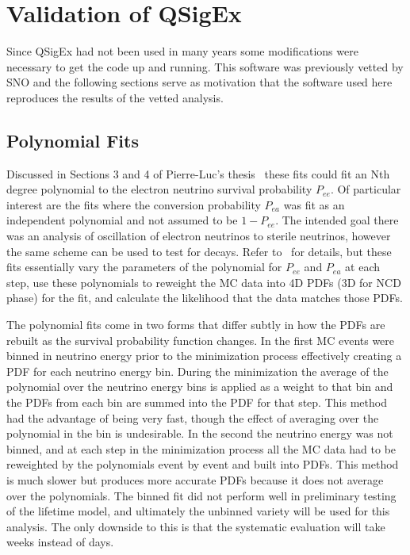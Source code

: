 \chapter{Validation of QSigEx}
\label{qsigex_validation}

Since QSigEx had not been used in many years some modifications were necessary to get the code up and running. 
This software was previously vetted by SNO and the following sections serve as motivation that the software used here reproduces the results of the vetted analysis.

\section{Polynomial Fits}

Discussed in Sections 3 and 4 of Pierre-Luc's thesis~\cite{plthesis} these fits could fit an Nth degree polynomial to the electron neutrino survival probability $P_{ee}$. 
Of particular interest are the fits where the conversion probability $P_{ea}$ was fit as an independent polynomial and not assumed to be $1-P_{ee}$. 
The intended goal there was an analysis of oscillation of electron neutrinos to sterile neutrinos, however the same scheme can be used to test for decays.
Refer to~\cite{plthesis} for details, but these fits essentially vary the parameters of the polynomial for $P_{ee}$ and $P_{ea}$ at each step, use these polynomials to reweight the MC data into 4D PDFs (3D for NCD phase) for the fit, and calculate the likelihood that the data matches those PDFs. 

The polynomial fits come in two forms that differ subtly in how the PDFs are rebuilt as the survival probability function changes.
In the first MC events were binned in neutrino energy prior to the minimization process effectively creating a PDF for each neutrino energy bin. 
During the minimization the average of the polynomial over the neutrino energy bins is applied as a weight to that bin and the PDFs from each bin are summed into the PDF for that step.
This method had the advantage of being very fast, though the effect of averaging over the polynomial in the bin is undesirable.
In the second the neutrino energy was not binned, and at each step in the minimization process all the MC data had to be reweighted by the polynomials event by event and built into PDFs. 
This method is much slower but produces more accurate PDFs because it does not average over the polynomials.
The binned fit did not perform well in preliminary testing of the lifetime model, and ultimately the unbinned variety will be used for this analysis.
The only downside to this is that the systematic evaluation will take weeks instead of days.

